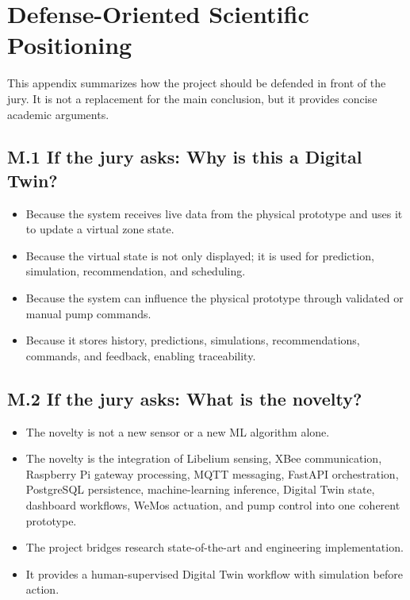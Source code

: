 \chapter{Defense-Oriented Scientific Positioning}

This appendix summarizes how the project should be defended in front of the jury. It is not a replacement for the main conclusion, but it provides concise academic arguments.

\section{M.1 If the jury asks: Why is this a Digital Twin?}

\begin{itemize}

\item Because the system receives live data from the physical prototype and uses it to update a virtual zone state.

\item Because the virtual state is not only displayed; it is used for prediction, simulation, recommendation, and scheduling.

\item Because the system can influence the physical prototype through validated or manual pump commands.

\item Because it stores history, predictions, simulations, recommendations, commands, and feedback, enabling traceability.

\end{itemize}

\section{M.2 If the jury asks: What is the novelty?}

\begin{itemize}

\item The novelty is not a new sensor or a new ML algorithm alone.

\item The novelty is the integration of Libelium sensing, XBee communication, Raspberry Pi gateway processing, MQTT messaging, FastAPI orchestration, PostgreSQL persistence, machine-learning inference, Digital Twin state, dashboard workflows, WeMos actuation, and pump control into one coherent prototype.

\item The project bridges research state-of-the-art and engineering implementation.

\item It provides a human-supervised Digital Twin workflow with simulation before action.

\end{itemize}

